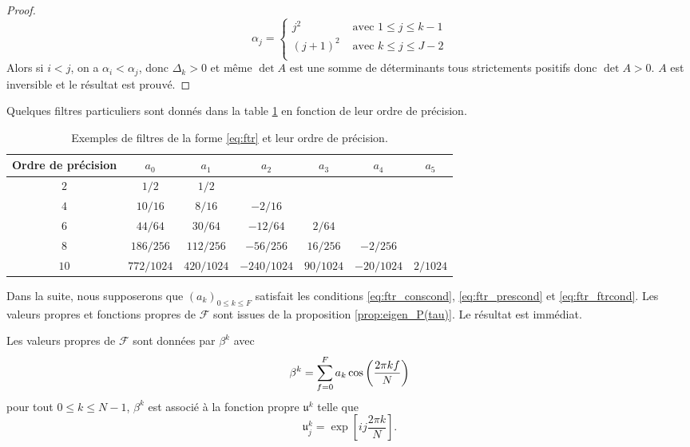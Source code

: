 \begin{proof}
\begin{equation}
\alpha_j = \left\lbrace
\begin{array}{ll}
j^2 & \text{ avec } 1 \leq j \leq k-1\\
(j+1)^2 & \text{ avec } k \leq j \leq J-2\\
\end{array}
\right.
\end{equation}
Alors si $i<j$, on a $\alpha_i < \alpha_j$, donc $\Delta_k>0$ et même $\det A$ est une somme de déterminants tous strictements positifs donc $\det A > 0$. $A$ est inversible et le résultat est prouvé.
\end{proof}
Quelques filtres particuliers sont donnés dans la table \ref{tab:filter} en fonction de leur ordre de précision.

\begin{table}[htbp]
\begin{center}
\begin{tabular}{|c||cccccc|}
\hline
\textbf{Ordre de précision} & $a_0$ & $a_1$ & $a_2$ & $a_3$ & $a_4$ & $a_5$ \\
\hline \hline
$2$ & $1/2$ & $1/2$ & & & & \\
\hline
$4$ & $10/16$ & $8/16$ & $-2/16$ & & & \\
\hline
$6$ & $44/64$ & $30/64$ & $-12/64$ & $2/64$ & & \\
\hline
$8$ & $186/256$ & $112/256$ & $-56/256$ & $16/256$ & $-2/256$ & \\
\hline
$10$ & $772/1024$ & $420/1024$ & $-240/1024$ & $90/1024$ & $-20/1024$ & $2/1024$ \\
\hline
\end{tabular}
\end{center}
\caption{Exemples de filtres de la forme \eqref{eq:ftr} et leur ordre de précision.}
\label{tab:filter}
\end{table}

Dans la suite, nous supposerons que $(a_k)_{0 \leq k \leq F}$ satisfait les conditions \eqref{eq:ftr_conscond}, \eqref{eq:ftr_prescond} et \eqref{eq:ftr_ftrcond}.
Les valeurs propres et fonctions propres de $\mathcal{F}$ sont issues de la proposition \ref{prop:eigen_P(tau)}. Le résultat est immédiat.

\begin{theoreme}
Les valeurs propres de $\mathcal{F}$ sont données par $\beta^k$ avec 
\begin{equation}
\beta^k = \displaystyle\sum\limits_{f=0}^F a_k \cos \left( \dfrac{2 \pi k f}{N} \right)
\end{equation}
pour tout $0 \leq k \leq N-1$, $\beta^k$ est associé à la fonction propre $\mathfrak{u}^k$ telle que 
\begin{equation}
\mathfrak{u}^k_j = \exp \left[ i j \dfrac{2 \pi k}{N} \right].
\end{equation}
\end{theoreme}

